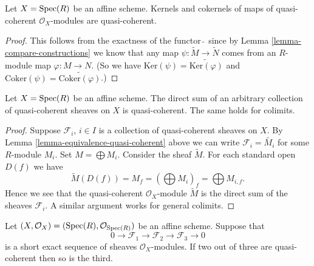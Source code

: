 \begin{lemma}
\label{lemma-kernel-cokernel-quasi-coherent}
Let $X = \mathop{\rm Spec}(R)$ be an affine scheme.
Kernels and cokernels of maps of quasi-coherent
$\mathcal{O}_X$-modules are quasi-coherent.
\end{lemma}

\begin{proof}
This follows from the exactness of the functor $\widetilde{\ }$
since by Lemma \ref{lemma-compare-constructions} we know that any map
$\psi : \widetilde{M} \to \widetilde{N}$ comes from
an $R$-module map $\varphi : M \to N$. (So we have
$\text{Ker}(\psi) = \widetilde{\text{Ker}(\varphi)}$ and
$\text{Coker}(\psi) = \widetilde{\text{Coker}(\varphi)}$.)
\end{proof}

\begin{lemma}
\label{lemma-colimit-quasi-coherent}
Let $X = \mathop{\rm Spec}(R)$ be an affine scheme.
The direct sum of an arbitrary collection of quasi-coherent sheaves
on $X$ is quasi-coherent. The same holds for colimits.
\end{lemma}

\begin{proof}
Suppose $\mathcal{F}_i$, $i \in I$ is a collection of quasi-coherent
sheaves on $X$. By Lemma \ref{lemma-equivalence-quasi-coherent}
above we can write $\mathcal{F}_i = \widetilde{M_i}$ for some $R$-module
$M_i$. Set $M = \bigoplus M_i$. Consider the sheaf $\widetilde{M}$.
For each standard open $D(f)$ we have
$$
\widetilde{M}(D(f)) = M_f =
\left(\bigoplus M_i\right)_f =
\bigoplus M_{i, f}.
$$
Hence we see that the quasi-coherent $\mathcal{O}_X$-module
$\widetilde{M}$ is the direct sum of the sheaves $\mathcal{F}_i$.
A similar argument works for general colimits.
\end{proof}

\begin{lemma}
\label{lemma-extension-quasi-coherent}
Let $(X, \mathcal{O}_X) = (\mathop{\rm Spec}(R), \mathcal{O}_{\mathop{\rm Spec}(R)})$
be an affine scheme. Suppose that
$$
0 \to
\mathcal{F}_1 \to
\mathcal{F}_2 \to
\mathcal{F}_3 \to
0
$$
is a short exact sequence of sheaves $\mathcal{O}_X$-modules.
If two out of three are quasi-coherent then so is the third.
\end{lemma}

